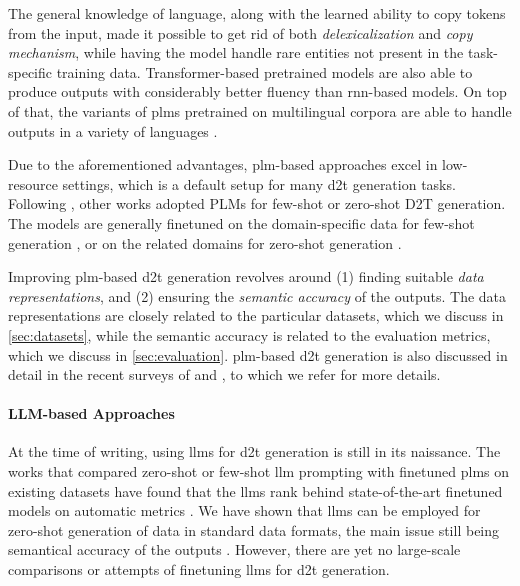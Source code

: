 The general knowledge of language, along with the learned ability to copy tokens from the input, made it possible to get rid of both \emph{delexicalization} and \emph{copy mechanism}, while having the model handle rare entities not present in the task-specific training data. Transformer-based pretrained models are also able to produce outputs with considerably better fluency than \ac{rnn}-based models. On top of that, the variants of \acp{plm} pretrained on multilingual corpora are able to handle outputs in a variety of languages \cite{liuMultilingualDenoisingPretraining2020,xueMT5MassivelyMultilingual2021}.

Due to the aforementioned advantages, \ac{plm}-based approaches excel in low-resource settings, which is a default setup for many \ac{d2t} generation tasks. Following \citet{chenFewShotNLGPreTrained2019}, other works adopted PLMs for few-shot or zero-shot D2T generation. The models are generally finetuned on the domain-specific data for few-shot generation \cite{changNeuralDatatoTextGeneration2021,suFewShotTabletoTextGeneration2021}, or on the related domains for zero-shot generation \cite{kasner2022neural,kasnerMindLabelsDescribing2022}.

Improving \ac{plm}-based \ac{d2t} generation revolves around (1) finding suitable \emph{data representations}, and (2) ensuring the \emph{semantic accuracy} of the outputs. The data representations are closely related to the particular datasets, which we discuss in \autoref{sec:datasets}, while the semantic accuracy is related to the evaluation metrics, which we discuss in \autoref{sec:evaluation}. \ac{plm}-based \ac{d2t} generation is also discussed in detail in the recent surveys of \citet{sharmaInnovationsNeuralDatatotext2022} and \citet{lin2023survey}, to which we refer for more details.

\paragraph{LLM-based Approaches} At the time of writing, using \acp{llm} for \ac{d2t} generation is still in its naissance. The works that compared zero-shot or few-shot \ac{llm} prompting with finetuned \acp{plm} on existing datasets have found that the \acp{llm} rank behind state-of-the-art finetuned models on automatic metrics \cite{axelssonUsingLargeLanguage2023,yuanEvaluatingGenerativeModels2023}. We have shown that \acp{llm} can be employed for zero-shot generation of data in standard data formats, the main issue still being semantical accuracy of the outputs \cite{kasnerReferenceBasedMetricsAnalyzing2024}. However, there are yet no large-scale comparisons or attempts of finetuning \acp{llm} for \ac{d2t} generation.

